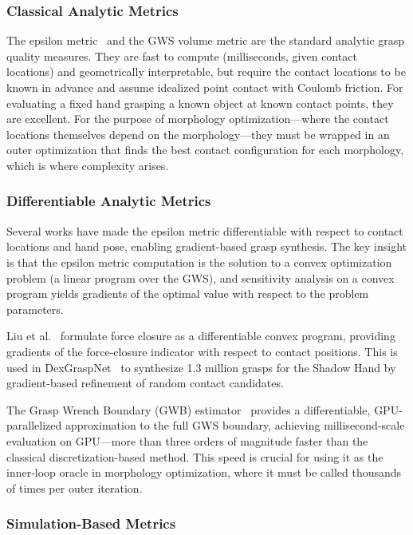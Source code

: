 \documentclass[journal]{IEEEtran}
\begin{document}
\subsubsection{Classical Analytic Metrics}

The epsilon metric~\cite{ferrari1992planning} and the GWS volume metric are the standard
analytic grasp quality measures.
They are fast to compute (milliseconds, given contact locations) and geometrically
interpretable, but require the contact locations to be known in advance and assume
idealized point contact with Coulomb friction.
For evaluating a fixed hand grasping a known object at known contact points, they are
excellent.
For the purpose of morphology optimization---where the contact locations themselves depend
on the morphology---they must be wrapped in an outer optimization that finds the
best contact configuration for each morphology, which is where complexity arises.

\subsubsection{Differentiable Analytic Metrics}

Several works have made the epsilon metric differentiable with respect to contact locations
and hand pose, enabling gradient-based grasp synthesis.
The key insight is that the epsilon metric computation is the solution to a convex
optimization problem (a linear program over the GWS), and sensitivity analysis on a
convex program yields gradients of the optimal value with respect to the problem parameters.

Liu et al.~\cite{dexgraspdfc} formulate force closure as a differentiable convex program,
providing gradients of the force-closure indicator with respect to contact positions.
This is used in DexGraspNet~\cite{wang2023dexgrasp} to synthesize 1.3 million grasps
for the Shadow Hand by gradient-based refinement of random contact candidates.

The Grasp Wrench Boundary (GWB) estimator~\cite{gwb2023} provides a differentiable,
GPU-parallelized approximation to the full GWS boundary, achieving millisecond-scale
evaluation on GPU---more than three orders of magnitude faster than the classical
discretization-based method.
This speed is crucial for using it as the inner-loop oracle in morphology optimization,
where it must be called thousands of times per outer iteration.

\subsubsection{Simulation-Based Metrics}
\end{document}
